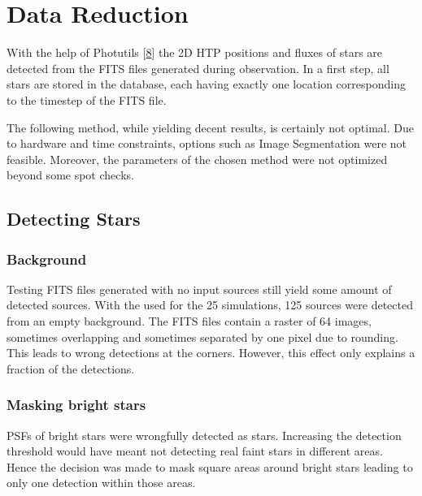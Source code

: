 \documentclass[letterpaper,10pt,english]{sphinxmanual}
\begin{document}
\chapter{Data Reduction}
\label{\detokenize{NBodySimulation/DataReduction:data-reduction}}\label{\detokenize{NBodySimulation/DataReduction::doc}}
\sphinxAtStartPar
With the help of Photutils {[}\hyperlink{cite.NBodySimulation/Appendix:id54}{8}{]} the 2D HTP positions and fluxes of stars are detected from the FITS files generated during observation.
In a first step, all stars are stored in the database, each having exactly one location corresponding to the timestep of the FITS file.

\sphinxAtStartPar
The following method, while yielding decent results, is certainly not optimal.
Due to hardware and time constraints, options such as Image Segmentation were not feasible. Moreover, the parameters of the chosen method were not optimized beyond some spot checks.


\section{Detecting Stars}
\label{\detokenize{NBodySimulation/DataReduction:detecting-stars}}

\subsection{Background}
\label{\detokenize{NBodySimulation/DataReduction:background}}\label{\detokenize{NBodySimulation/DataReduction:background-label}}
\sphinxAtStartPar
Testing FITS files generated with no input sources still yield some amount of detected sources.
With the {\hyperref[\detokenize{NBodySimulation/Experiments:parameters-label}]{}} used for the 25 simulations, 125 sources were detected from an empty background.
The FITS files contain a raster of 64 images, sometimes overlapping and sometimes separated by one pixel due to rounding.
This leads to wrong detections at the corners. However, this effect only explains a fraction of the detections.


\subsection{Masking bright stars}
\label{\detokenize{NBodySimulation/DataReduction:masking-bright-stars}}\label{\detokenize{NBodySimulation/DataReduction:masking-bright-stars-label}}
\sphinxAtStartPar
PSFs of bright stars were wrongfully detected as stars. Increasing the detection threshold would have meant not detecting real faint stars in different areas.
Hence the decision was made to mask square areas around bright stars leading to only one detection within those areas.
\end{document}
